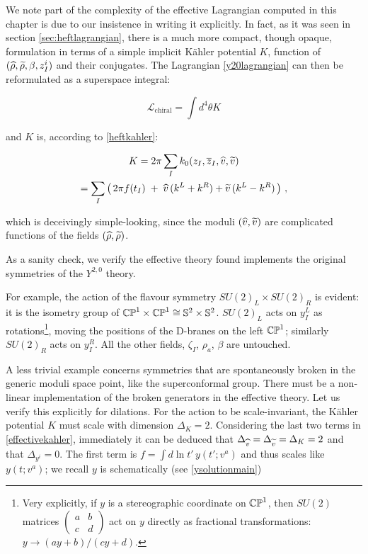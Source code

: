 We note part of the complexity of the effective Lagrangian computed in this chapter is due to our insistence in writing it explicitly. In fact, as it was seen in section \ref{sec:heftlagrangian}, there is a much more compact, though opaque, formulation in terms of a simple implicit K\"ahler potential $K$, function of $(\widehat{\rho},\widetilde{\rho},\beta,z_I^i)$ and their conjugates. The Lagrangian \eqref{y20lagrangian} can then be reformulated as a superspace integral:

\begin{equation}
	\mathcal{L}_\mathrm{chiral} = \int d^4 \theta K
	\label{}
\end{equation}

and $K$ is, according to \eqref{heftkahler}:

\begin{gather}
	K = 2\pi \sum_I k_0(z_I, \overline{z}_I,\widehat{v}, \widetilde{v}) \\
	= \sum_I \left(\, 2\pi f(t_I) \;+\; \widehat{v}\, (k^L + k^R) + \widetilde{v}\,(k^L - k^R)\, \right)\,,
	\label{effectivekahler}
\end{gather}

which is deceivingly simple-looking, since the moduli $(\widehat{v},\widetilde{v})$ are complicated functions of the fields $(\widehat{\rho},\widetilde{\rho})$.

As a sanity check, we verify the effective theory found implements the original symmetries of the $Y^{2,0}$ theory. 

For example, the action of the flavour symmetry $SU(2)_L \times SU(2)_R$ is evident: it is the isometry group of $\mathbb{CP}^1 \times \mathbb{CP}^1 \cong \mathbb{S}^2 \times \mathbb{S}^2$. $SU(2)_L$ acts on $y^L_I$ as rotations\footnote{Very explicitly, if $y$ is a stereographic coordinate on $\mathbb{CP}^1$, then $SU(2)$ matrices $\begin{pmatrix}a & b\\ c & d\end{pmatrix}$ act on $y$ directly as fractional transformations: $y \rightarrow (ay+b)/(cy+d)$.}, moving the positions of the D-branes on the left $\mathbb{CP}^1$; similarly $SU(2)_R$ acts on $y^R_I$. All the other fields, $\zeta_I$, $\rho_a$, $\beta$ are untouched.

A less trivial example concerns symmetries that are spontaneously broken in the generic moduli space point, like the superconformal group. There must be a non-linear implementation of the broken generators in the effective theory. Let us verify this explicitly for dilations. For the action to be scale-invariant, the K\"ahler potential $K$ must scale with dimension $\Delta_K = 2$. Considering the last two terms in \eqref{effectivekahler}, immediately it can be deduced that $\Delta_{\widehat{v}} = \Delta_{\widetilde{v}} = \Delta_K = 2$ and that $\Delta_{y^i}=0$. The first term is $f = \int d\ln t' \, y(t';v^a)$ and thus scales like $y(t;v^a)$; we recall $y$ is schematically (see \eqref{ysolutionmain})


